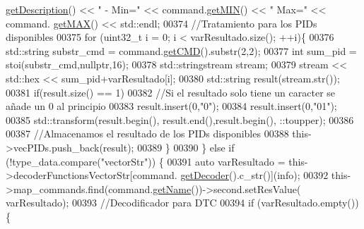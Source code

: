 \begin{DoxyCode}
{{{{{{{{{{      \hyperlink{classCommands_ad82fe7dfcf1908423bdb59d048020e26}{getDescription}() << \textcolor{stringliteral}{" - Min="} << command.\hyperlink{classCommands_af0a1e2ea65b5a57997c721a8d77a1013}{getMIN}() << \textcolor{stringliteral}{" Max="} << command.
      \hyperlink{classCommands_afbad1051313d0cdecba276384cb7fc6b}{getMAX}() << std::endl;
00374                                     \textcolor{comment}{//Tratamiento para los PIDs disponibles}
00375                                     \textcolor{keywordflow}{for} (uint32\_t i = 0; i < varResultado.size(); ++i)\{
00376                                         std::string substr\_cmd = command.\hyperlink{classCommands_a9aee21ab91fdfc8e9daa59e1e8f20b73}{getCMD}().substr(2,2);
00377                                         \textcolor{keywordtype}{int} sum\_pid = stoi(substr\_cmd,\textcolor{keyword}{nullptr},16);
00378                                         std::stringstream stream;
00379                                         stream << std::hex << sum\_pid+varResultado[i];
00380                                         std::string result(stream.str());
00381                                         \textcolor{keywordflow}{if}(result.size() == 1)
00382                                         \textcolor{comment}{//Si el resultado solo tiene un caracter se añade un 0 al principio}
00383                                             result.insert(0,\textcolor{stringliteral}{"0"});
00384                                         result.insert(0,\textcolor{stringliteral}{"01"});
00385                                         std::transform(result.begin(), result.end(),result.begin(), 
      ::toupper);
00386 
00387                                         \textcolor{comment}{//Almacenamos el resultado de los PIDs disponibles}
00388                                         this->vecPIDs.push\_back(result);
00389                                     \}
00390                                 \} \textcolor{keywordflow}{else} \textcolor{keywordflow}{if} (!type\_data.compare(\textcolor{stringliteral}{"vectorStr"})) \{
00391                                     \textcolor{keyword}{auto} varResultado = this->decoderFunctionsVectorStr[command.
      \hyperlink{classCommands_a8b4c2a655d8dd3de334338d6684d469c}{getDecoder}().c\_str()](info);
00392                                     this->map\_commands.find(command.\hyperlink{classCommands_adf3d8a96310b1f4e57a6ecf0f2f153ea}{getName}())->second.setResValue(
      varResultado);
00393                                     \textcolor{comment}{//Decodificador para DTC}
00394                                     \textcolor{keywordflow}{if} (varResultado.empty())\{
}}}}}}}}}}
\end{DoxyCode}
